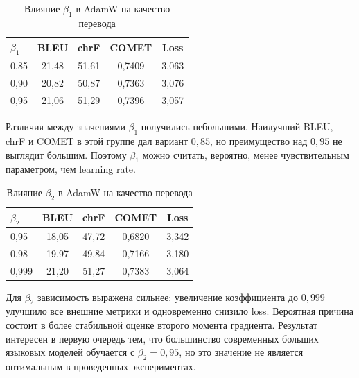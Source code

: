 \begin{table}[H]
	\centering
	\caption{Влияние $\beta_1$ в AdamW на качество перевода}
	\label{tab:beta1-comparison}
	\begin{tabular}{|p{}|c|c|c|c|}
		\hline
		\textbf{$\beta_1$} & \textbf{BLEU} & \textbf{chrF} & \textbf{COMET} & \textbf{Loss} \\
		\hline
		0{,}85             & 21{,}48       & 51{,}61       & 0{,}7409       & 3{,}063       \\
		\hline
		0{,}90             & 20{,}82       & 50{,}87       & 0{,}7363       & 3{,}076       \\
		\hline
		0{,}95             & 21{,}06       & 51{,}29       & 0{,}7396       & 3{,}057       \\
		\hline
	\end{tabular}
\end{table}

Различия между значениями $\beta_1$ получились небольшими. Наилучший BLEU, chrF и COMET в этой группе дал вариант $0{,}85$, но преимущество над $0{,}95$ не выглядит большим.
Поэтому $\beta_1$ можно считать, вероятно, менее чувствительным параметром, чем learning rate.

\begin{table}[H]
	\centering
	\caption{Влияние $\beta_2$ в AdamW на качество перевода}
	\label{tab:beta2-comparison}
	\begin{tabular}{|p{}|c|c|c|c|}
		\hline
		\textbf{$\beta_2$} & \textbf{BLEU} & \textbf{chrF} & \textbf{COMET} & \textbf{Loss} \\
		\hline
		0{,}95             & 18{,}05       & 47{,}72       & 0{,}6820       & 3{,}342       \\
		\hline
		0{,}98             & 19{,}97       & 49{,}84       & 0{,}7166       & 3{,}180       \\
		\hline
		0{,}999            & 21{,}20       & 51{,}27       & 0{,}7383       & 3{,}064       \\
		\hline
	\end{tabular}
\end{table}

Для $\beta_2$ зависимость выражена сильнее: увеличение коэффициента до $0{,}999$ улучшило все внешние метрики и одновременно снизило loss.
Вероятная причина состоит в более стабильной оценке второго момента градиента.
Результат интересен в первую очередь тем, что большинство современных больших языковых моделей обучается с $\beta_2 = 0{,}95$, но это значение не является оптимальным в проведенных экспериментах.

